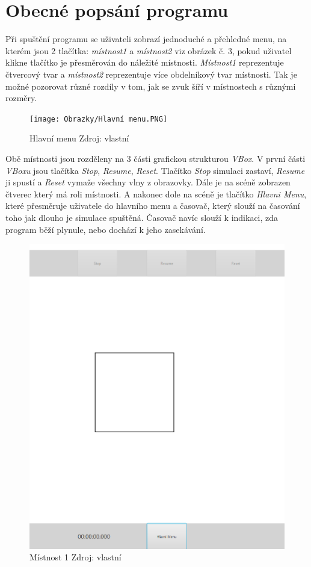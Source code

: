 \section{Obecné popsání programu}
Při spuštění programu se uživateli zobrazí jednoduché a přehledné menu,  na kterém jsou 2 tlačítka: \textit{místnost1} a \textit{místnost2} viz obrázek č. 3, pokud uživatel klikne tlačítko je přesměrován do náležité místnosti. \textit{Místnost1} reprezentuje čtvercový tvar  a \textit{místnost2} reprezentuje více obdelníkový tvar místnosti. Tak je možné pozorovat různé rozdíly v tom, jak se zvuk šíří v místnostech s různými rozměry. 

    \begin{figure}[htpb]
    \centering
    \texttt{[image: Obrazky/Hlavní menu.PNG]}
    \caption{Hlavní menu \vspace{0.1cm}
    \newline Zdroj: vlastní}
    
    \label{fig:enter-label}
    \end{figure}
Obě místnosti jsou rozděleny na 3 části grafickou strukturou \textit{VBox}. V první části \textit{VBoxu} jsou tlačítka \textit{Stop}, \textit{Resume}, \textit{Reset}. Tlačítko \textit{Stop} simulaci zastaví, \textit{Resume} ji spustí a \textit{Reset} vymaže všechny vlny z obrazovky. Dále je na scéně zobrazen čtverec který má roli místnosti. A nakonec dole na scéně je tlačítko \textit{Hlavni Menu}, které přesměruje uživatele do hlavního menu a časovač, který slouží na časování toho jak dlouho je simulace spuštěná. Časovač  navíc slouží k indikaci, zda program běží plynule, nebo dochází k jeho zasekávání.\newpage 

\begin{figure}[htpb]
    \centering
    \includegraphics[width=0.7\linewidth]{Obrazky/mistnost0.png}
    \caption{Místnost 1 Zdroj: vlastní}
    \label{fig:enter-label}
\end{figure}

